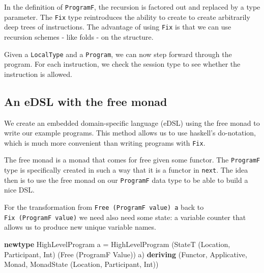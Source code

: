 \documentclass[runningheads]{llncs}
\newenvironment{Shaded}{}{}
\newcommand{\KeywordTok}[1]{\textcolor[rgb]{0.00,0.44,0.13}{\textbf{#1}}}
\newcommand{\DataTypeTok}[1]{\textcolor[rgb]{0.56,0.13,0.00}{#1}}
\newcommand{\FunctionTok}[1]{\textcolor[rgb]{0.02,0.16,0.49}{#1}}
\newcommand{\NormalTok}[1]{#1}
\begin{document}
In the definition of \texttt{ProgramF}, the recursion is factored out
and replaced by a type parameter. The \texttt{Fix} type reintroduces the
ability to create to create arbitrarily deep trees of instructions. The
advantage of using \texttt{Fix} is that we can use recursion schemes -
like folds - on the structure.

Given a \texttt{LocalType} and a \texttt{Program}, we can now step
forward through the program. For each instruction, we check the session
type to see whether the instruction is allowed.

\subsection{An eDSL with the free
monad}\label{an-edsl-with-the-free-monad}

We create an embedded domain-specific language (eDSL) using the free
monad to write our example programs. This method allows us to use
haskell's do-notation, which is much more convenient than writing
programs with \texttt{Fix}.

The free monad is a monad that comes for free given some functor. The
\texttt{ProgramF} type is specifically created in such a way that it is
a functor in \texttt{next}. The idea then is to use the free monad on
our \texttt{ProgramF} data type to be able to build a nice DSL.

For the transformation from \texttt{Free\ (ProgramF\ value)\ a} back to
\texttt{Fix\ (ProgramF\ value)} we need also need some state: a variable
counter that allows us to produce new unique variable names.

\begin{Shaded}
\begin{Highlighting}[]
\KeywordTok{newtype} \DataTypeTok{HighLevelProgram}\NormalTok{ a }\FunctionTok{=} 
    \DataTypeTok{HighLevelProgram}\NormalTok{ (}\DataTypeTok{StateT}\NormalTok{ (}\DataTypeTok{Location}\NormalTok{, }\DataTypeTok{Participant}\NormalTok{, }\DataTypeTok{Int}\NormalTok{) (}\DataTypeTok{Free}\NormalTok{ (}\DataTypeTok{ProgramF} \DataTypeTok{Value}\NormalTok{)) a)}
        \KeywordTok{deriving}\NormalTok{ (}\DataTypeTok{Functor}\NormalTok{, }\DataTypeTok{Applicative}\NormalTok{, }\DataTypeTok{Monad}\NormalTok{, }\DataTypeTok{MonadState}\NormalTok{ (}\DataTypeTok{Location}\NormalTok{, }\DataTypeTok{Participant}\NormalTok{, }\DataTypeTok{Int}\NormalTok{))}
\end{Highlighting}
\end{Shaded}
\end{document}

